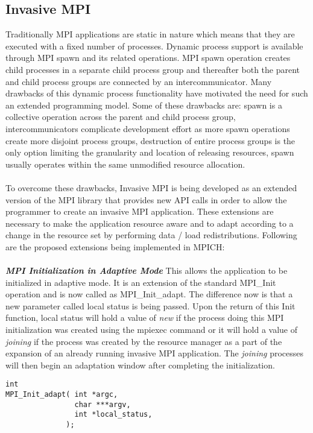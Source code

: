 \subsection{Invasive MPI}
Traditionally MPI applications are static in nature which means that they are executed with a fixed number of processes. Dynamic process support is available through MPI spawn and its related operations. MPI spawn operation creates child processes in a separate child process group and thereafter both the parent and child process groups are connected by an intercommunicator. Many drawbacks of this dynamic process functionality have motivated the need for such an extended programming model. Some of these drawbacks are: spawn is a collective operation across the parent and child process group, intercommunicators complicate development effort as more spawn operations create more disjoint process groups, destruction of entire process groups is the only option limiting the granularity and location of releasing resources, spawn usually operates within the same unmodified resource allocation.\\ \\
To overcome these drawbacks, Invasive MPI is being developed as an extended version of the MPI library that provides new API calls in order to allow the programmer to create an invasive MPI application. These extensions are necessary to make the application resource aware and to adapt according to a change in the resource set by performing data / load redistributions. Following are the proposed extensions being implemented in MPICH:\\ \\
\textbf{\textit{MPI Initialization in Adaptive Mode}} This allows the application to be initialized in adaptive mode. It is an extension of the standard MPI{\_}Init operation and is now called as MPI{\_}Init{\_}adapt. The difference now is that a new parameter called local status is being passed. Upon the return of this Init function, local status will hold a value of \textit{new} if the process doing this MPI initialization was created using the mpiexec command or it will hold a value of \textit{joining} if the process was created by the resource manager as a part of the expansion of an already running invasive MPI application. The \textit{joining} processes will then begin an adaptation window after completing the initialization. 
\begin{lstlisting}[frame=single]
int 
MPI_Init_adapt( int *argc,
                char ***argv,
                int *local_status,
              );
\end{lstlisting}
